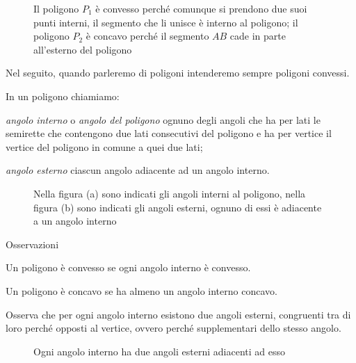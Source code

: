 \begin{inaccessibleblock}
 \begin{figure}[htb]
\centering
\caption{Il poligono $P_1$ è convesso perché comunque si prendono due 
suoi punti interni, il segmento che li unisce è interno al poligono; 
il poligono $P_2$ è concavo perché il segmento $AB$ cade in parte 
all'esterno del poligono}
\end{figure}
\end{inaccessibleblock}

Nel seguito, quando parleremo di poligoni intenderemo sempre poligoni 
convessi.

\begin{definizione}
In un poligono chiamiamo:
\begin{itemize*}
\item \emph{angolo interno} o \emph{angolo del poligono} ognuno degli 
angoli che ha per lati le semirette che contengono due lati 
consecutivi del poligono e ha per vertice il vertice del poligono in 
comune a quei due lati;
\item \emph{angolo esterno} ciascun angolo adiacente ad un angolo 
interno.
\end{itemize*}
\end{definizione}


\begin{inaccessibleblock}
 \begin{figure}[htb]
\centering
\caption{Nella figura (a) sono indicati gli angoli interni al 
poligono, nella figura (b) sono indicati gli angoli esterni, ognuno 
di essi è adiacente a un angolo interno}
\end{figure}
\end{inaccessibleblock}

Osservazioni
\begin{itemize*}
\item Un poligono è convesso se ogni angolo interno è convesso.
\item Un poligono è concavo se ha almeno un angolo interno concavo.
\end{itemize*}

Osserva che per ogni angolo interno esistono due angoli esterni, 
congruenti tra di loro perché opposti al vertice, ovvero perché 
supplementari dello stesso angolo.


\begin{inaccessibleblock}
 \begin{figure}[htb]
\centering
\caption{Ogni angolo interno ha due angoli esterni adiacenti ad esso}
\end{figure}
\end{inaccessibleblock}

